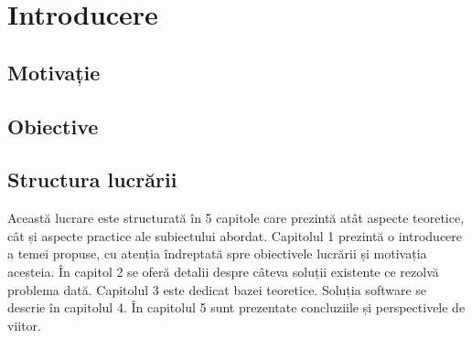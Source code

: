 \chapter{Introducere}
\label{intro}

\iffalse
Hobby-ul este o activitate plăcută pe care o persoană o face regulat, cu dorința de a se relaxa. Acesta nu trebuie confundat cu profesia, deoarece nu urmărește vreun obiectiv profesional sau financiar.
\fi

\section{Motivație}
\label{section:ch1sec1}


\section{Obiective}
\label{section:ch1sec2}


\section{Structura lucrării}
\label{section:ch1sec3}

Această lucrare este structurată în 5 capitole care prezintă atât aspecte teoretice, cât și aspecte practice ale subiectului abordat. Capitolul 1 prezintă o introducere a temei propuse, cu atenția îndreptată spre obiectivele lucrării și motivația acesteia. În capitol 2 se oferă detalii despre câteva soluții existente ce rezolvă problema dată. Capitolul 3 este dedicat bazei teoretice. Soluția software se descrie în capitolul 4. În capitolul 5 sunt prezentate concluziile și perspectivele de viitor.